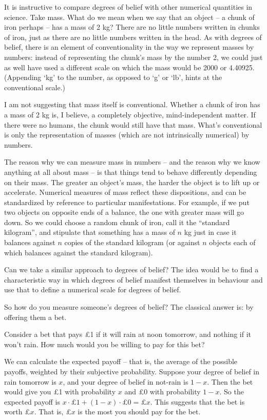 It is instructive to compare degrees of belief with other numerical
quantities in science. Take mass. What do we mean when we say
that an object -- a chunk of iron perhaps -- has a mass of 2 kg? There
are no little numbers written in chunks of iron, just as there are no
little numbers written in the head. As with degrees of belief, there
is an element of conventionality in the way we represent masses by
numbers: instead of representing the chunk's mass by the number 2, we
could just as well have used a different scale on which the mass would
be 2000 or 4.40925. (Appending `kg' to the number, as opposed to `g'
or `lb', hints at the conventional scale.)

I am not suggesting that mass itself is conventional. Whether a chunk
of iron has a mass of 2 kg is, I believe, a completely objective, mind-independent
matter. If there were no humans, the chunk would still have that
mass. What's conventional is only the representation of masses (which
are not intrinsically numerical) by numbers.

The reason why we can measure mass in numbers -- and the reason why we
know anything at all about mass -- is that things tend to behave
differently depending on their mass. The greater an object's mass, the
harder the object is to lift up or accelerate. Numerical measures of
mass reflect these dispositions, and can be standardized by reference
to particular manifestations. For example, if we put two objects on
opposite ends of a balance, the one with greater mass will go down. So
we could choose a random chunk of iron, call it the ``standard
kilogram'', and stipulate that something has a mass of $n$ kg just in
case it balances against $n$ copies of the standard kilogram (or
against $n$ objects each of which balances against the standard
kilogram). 

Can we take a similar approach to degrees of belief? The idea would be
to find a characteristic way in which degrees of belief manifest
themselves in behaviour and use that to define a numerical scale for
degrees of belief.

So how do you measure someone's degrees of belief? The classical
answer is: by offering them a bet. 

Consider a bet that pays £1 if it will rain at noon tomorrow, and
nothing if it won't rain. How much would you be willing to pay for
this bet?

We can calculate the expected payoff -- that is, the average of the
possible payoffs, weighted by their subjective probability.  Suppose
your degree of belief in rain tomorrow is $x$, and your degree of
belief in not-rain is $1-x$. Then the bet would give you £1 with
probability $x$ and £0 with probability $1-x$. So the expected payoff
is $x \cdot \text{£1} + (1-x) \cdot \text{£0} = \text{£}x$. This
suggests that the bet is worth £$x$. That is, £$x$ is the most you
should pay for the bet.


